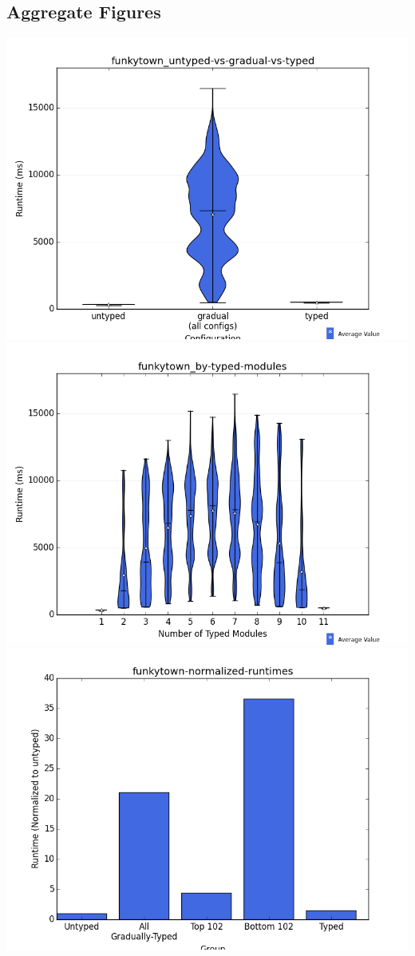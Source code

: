 \documentclass{article}
\begin{document}
\subsection{Aggregate Figures}
\includegraphics[width=\textwidth]{funkytown_untyped-vs-gradual-vs-typed-violin.png}
\includegraphics[width=\textwidth]{funkytown_by-typed-modules-violin.png}
\includegraphics[width=\textwidth]{funkytown-normalized-runtimes-bar.png}
\end{document}
